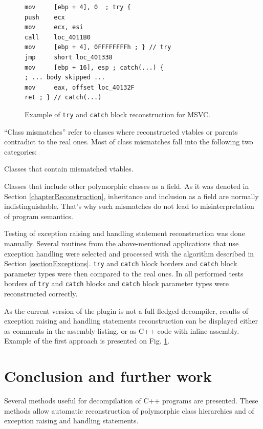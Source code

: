 \documentclass[times, 10pt,twocolumn]{article}
\renewcommand{\~}{{\raise.35ex\hbox{$\scriptstyle\sim$}}}
\renewenvironment{itemize}{
    \begin{list}{\labelitemi}{\itemsep=-\parsep}
}{
	\end{list}
}
\begin{document}
\begin{figure}[tb!]
\centering
{
\lstset{basicstyle=\small, language=[x86masm]Assembler}
\begin{lstlisting}
mov     [ebp + 4], 0  ; try {
push    ecx
mov     ecx, esi
call    loc_4011B0
mov     [ebp + 4], 0FFFFFFFFh ; } // try
jmp     short loc_401338
mov     [ebp + 16], esp ; catch(...) {
; ... body skipped ...
mov     eax, offset loc_40132F
ret ; } // catch(...)
\end{lstlisting}
}
\caption{Example of \lstinline{try} and \lstinline{catch} block reconstruction for MSVC.}
\label{fig:except}
\end{figure}

``Class mismatches'' refer to classes where reconstructed vtables or parents
contradict to the real ones. Most of class mismatches fall into the
following two categories:
\begin{itemize}
\item Classes that contain mismatched vtables.
\item Classes that include other polymorphic classes as a field.
    As it was denoted in Section \ref{chapterReconstruction}, inheritance and inclusion
    as a field are normally indistinguishable. That's why such mismatches
    do not lead to misinterpretation of program semantics.
\end{itemize}

Testing of exception raising and handling statement reconstruction was done manually.
Several routines from the above-mentioned applications that use
exception handling were selected and processed with the algorithm described in
Section \ref{sectionExceptions}. \lstinline{try} and \lstinline{catch} block
borders and \lstinline{catch} block parameter types were then compared to
the real ones. In all performed tests borders of \lstinline{try} and
\lstinline{catch} blocks and \lstinline{catch} block parameter types
were reconstructed correctly.

As the current version of the plugin is not a full-fledged decompiler,
results of exception raising and handling statements reconstruction
can be displayed either as comments in the assembly listing, or
as C++ code with inline assembly. Example of the first approach
is presented on Fig. \ref{fig:except}.




\quad
\section{Conclusion and further work}
Several methods useful for decompilation of C++ programs are presented.
These methods allow automatic reconstruction
of polymorphic class hierarchies and of exception raising and
handling statements.
\end{document}
